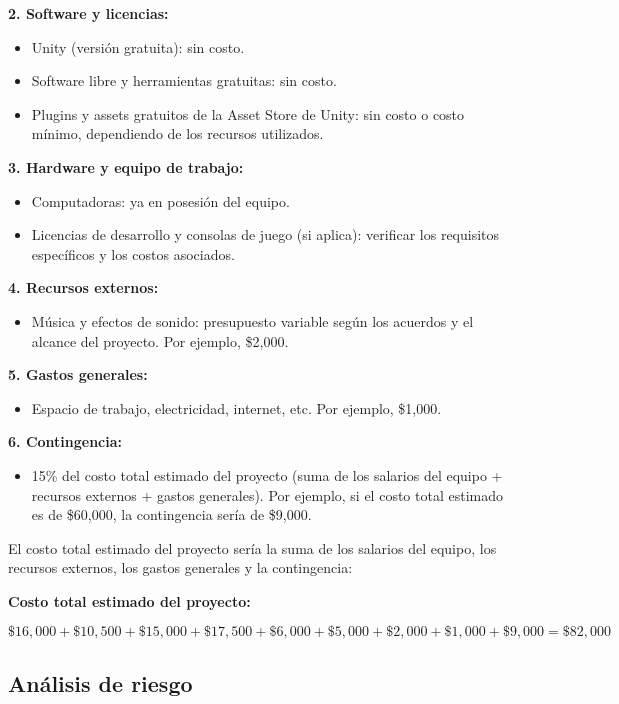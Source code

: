 \textbf{2. Software y licencias:}
\begin{itemize}
	\item Unity (versión gratuita): sin costo.
	\item Software libre y herramientas gratuitas: sin costo.
	\item Plugins y assets gratuitos de la Asset Store de Unity: sin costo o costo mínimo, dependiendo de los recursos utilizados.
\end{itemize}

\textbf{3. Hardware y equipo de trabajo:}
\begin{itemize}
	\item Computadoras: ya en posesión del equipo.
	\item Licencias de desarrollo y consolas de juego (si aplica): verificar los requisitos específicos y los costos asociados.
\end{itemize}

\textbf{4. Recursos externos:}
\begin{itemize}
	\item Música y efectos de sonido: presupuesto variable según los acuerdos y el alcance del proyecto. Por ejemplo, \$2,000.
\end{itemize}

\textbf{5. Gastos generales:}
\begin{itemize}
	\item Espacio de trabajo, electricidad, internet, etc. Por ejemplo, \$1,000.
\end{itemize}

\textbf{6. Contingencia:}
\begin{itemize}
	\item 15\% del costo total estimado del proyecto (suma de los salarios del equipo + recursos externos + gastos generales). Por ejemplo, si el costo total estimado es de \$60,000, la contingencia sería de \$9,000.
\end{itemize}

El costo total estimado del proyecto sería la suma de los salarios del equipo, los recursos externos, los gastos generales y la contingencia:

\textbf{Costo total estimado del proyecto:}

\[\$16,000+\$10,500+\$15,000+\$17,500+\$6,000+\$5,000+\$2,000+\$1,000+\$9,000=\$82,000\]

\subsection{Análisis de riesgo}

